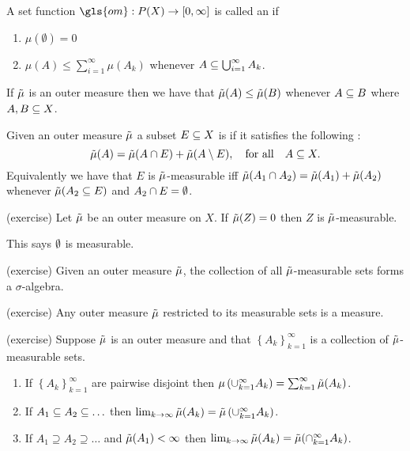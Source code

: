 \begin{defn}
  A set function $\gls{om}:P(X)\to [0,\infty]$ is called an  if
  \begin{enumerate}
    \item $\mu(\emptyset)=0$
    \item  $\mu(A)\le \sum_{i=1}^\infty \mu(A_k)$ whenever $A\subseteq
      \bigcup_{i=1}^\infty A_k$.
  \end{enumerate}
\end{defn}

\begin{remark}
If $\tilde{\mu}$ is an outer measure then we have that $\tilde{\mu}(A)\le \tilde{\mu}(B)$
whenever $A\subseteq B$ where $A,B\subseteq X$.
\end{remark}

\begin{defn}
  Given an outer measure $\tilde{\mu}$ a subset $E\subseteq X$ is
   if it satisfies the following
  : 
  \begin{equation}
   \tilde{\mu}(A) = \tilde{\mu}(A\cap E)+\tilde{\mu}(A\setminus E), \quad\text{for all}\quad A\subseteq X.
  \end{equation}
  Equivalently we have that $E$ is $\tilde{\mu}$-measurable iff
  $\tilde{\mu}(A_1\cap A_2) = \tilde{\mu}(A_1)+\tilde{\mu}(A_2)$ whenever $\tilde{\mu}(A_2\subseteq E)$ and
  $A_2\cap E=\emptyset$.
\end{defn}

\begin{prop}(exercise)
  Let $\tilde{\mu}$ be an outer measure on $X$. If $\tilde{\mu}(Z) = 0$ then $Z$ is
  $\tilde{\mu}$-measurable.
\end{prop}

\begin{note}
  This says $\emptyset$ is measurable.  
\end{note}

\begin{prop}
  (exercise) Given an outer measure $\tilde{\mu}$, the collection of all
  $\tilde{\mu}$-measurable sets forms a $\sigma$-algebra.
\end{prop}

\begin{prop}(exercise)
  Any outer measure $\tilde{\mu}$ restricted to its measurable sets is a
  measure.
\end{prop}

\begin{thm}(exercise)
  Suppose $\tilde{\mu}$ is an outer measure and that $\left\{ A_k
  \right\}_{k=1}^\infty$ is a collection of $\tilde{\mu}$-measurable sets.
  \begin{enumerate}
    \item If $\left\{ A_k\right\}_{k=1}^\infty$ are pairwise disjoint then
      $\mu\left( \cup_{k=1}^\infty A_k \right) =
      \sum_{k=1}^\infty\tilde{\mu}(A_k)$.
    \item If $A_1\subseteq A_2 \subseteq \ldots$ then
      $\lim_{k\to \infty}\tilde{\mu}(A_k) = \tilde{\mu}\left( \cup_{k=1}^\infty A_k
      \right)$.
    \item If $A_1 \supseteq A_2 \supseteq \ldots$ and $\tilde{\mu}(A_1) <
      \infty$ then $\lim_{k\to \infty}\tilde{\mu}(A_k) = \tilde{\mu}(\cap_{k=1}^\infty
      A_k)$.
  \end{enumerate}
\end{thm}

